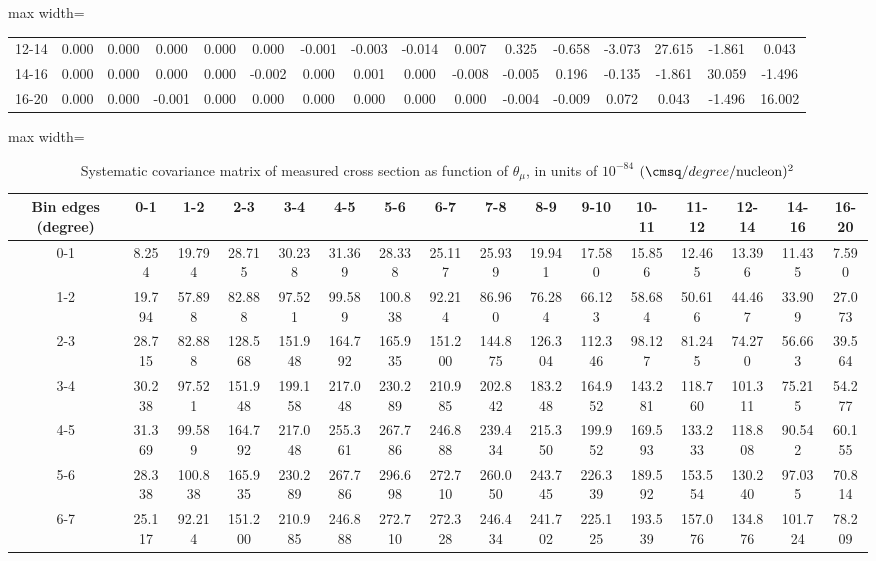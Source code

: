\documentclass[11pt]{article}
\begin{document}
\begin{table}
\begin{adjustbox}{max width=\textwidth}
\begin{tabular}{c||ccccccccccccccc}
      12-14 & 0.000 & 0.000 & 0.000 & 0.000 & 0.000 & -0.001 & -0.003 & -0.014 & 0.007 & 0.325 & -0.658 & -3.073 & 27.615 & -1.861 & 0.043\\
      14-16 & 0.000 & 0.000 & 0.000 & 0.000 & -0.002 & 0.000 & 0.001 & 0.000 & -0.008 & -0.005 & 0.196 & -0.135 & -1.861 & 30.059 & -1.496\\
      16-20 & 0.000 & 0.000 & -0.001 & 0.000 & 0.000 & 0.000 & 0.000 & 0.000 & 0.000 & -0.004 & -0.009 & 0.072 & 0.043 & -1.496 & 16.002
    \end{tabular}
  \end{adjustbox}
  \label{tbl:statcov_thetamu_deg_scintillator}
\end{table}

\begin{table}
  \centering
  \renewcommand{\arraystretch}{1.15}
  \caption{Systematic covariance matrix of measured cross section as function of $\theta_{\mu}$, in units of $10^{-84}$ $(\cmsq/degree/\mathrm{nucleon})^2$}
  \begin{adjustbox}{max width=\textwidth}
    \begin{tabular}{c||ccccccccccccccc}
      Bin edges (degree) & 0-1 & 1-2 & 2-3 & 3-4 & 4-5 & 5-6 & 6-7 & 7-8 & 8-9 & 9-10 & 10-11 & 11-12 & 12-14 & 14-16 & 16-20\\
      \hline
      \hline
      0-1 & 8.254 & 19.794 & 28.715 & 30.238 & 31.369 & 28.338 & 25.117 & 25.939 & 19.941 & 17.580 & 15.856 & 12.465 & 13.396 & 11.435 & 7.590\\
      1-2 & 19.794 & 57.898 & 82.888 & 97.521 & 99.589 & 100.838 & 92.214 & 86.960 & 76.284 & 66.123 & 58.684 & 50.616 & 44.467 & 33.909 & 27.073\\
      2-3 & 28.715 & 82.888 & 128.568 & 151.948 & 164.792 & 165.935 & 151.200 & 144.875 & 126.304 & 112.346 & 98.127 & 81.245 & 74.270 & 56.663 & 39.564\\
      3-4 & 30.238 & 97.521 & 151.948 & 199.158 & 217.048 & 230.289 & 210.985 & 202.842 & 183.248 & 164.952 & 143.281 & 118.760 & 101.311 & 75.215 & 54.277\\
      4-5 & 31.369 & 99.589 & 164.792 & 217.048 & 255.361 & 267.786 & 246.888 & 239.434 & 215.350 & 199.952 & 169.593 & 133.233 & 118.808 & 90.542 & 60.155\\
      5-6 & 28.338 & 100.838 & 165.935 & 230.289 & 267.786 & 296.698 & 272.710 & 260.050 & 243.745 & 226.339 & 189.592 & 153.554 & 130.240 & 97.035 & 70.814\\
      6-7 & 25.117 & 92.214 & 151.200 & 210.985 & 246.888 & 272.710 & 272.328 & 246.434 & 241.702 & 225.125 & 193.539 & 157.076 & 134.876 & 101.724 & 78.209\\

\end{tabular}
\end{adjustbox}
\end{table}
\end{document}
